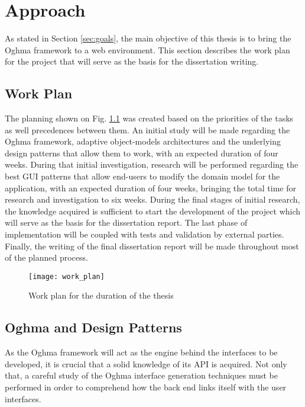 \chapter{Approach}\label{chap:approach}

As stated in Section \ref{sec:goals}, the main objective of this thesis is to bring the Oghma framework to a web environment. This section describes the work plan for the project that will serve as the basis for the dissertation writing.

\section{Work Plan}\label{sec:work_plan}

The planning shown on Fig. \ref{fig:work_plan} was created based on the priorities of the tasks as well precedences between them. An initial study will be made regarding the Oghma framework, adaptive object-models architectures and the underlying design patterns that allow them to work, with an expected duration of four weeks. During that initial investigation, research will be performed regarding the best GUI patterns that allow end-users to modify the domain model for the application, with an expected duration of four weeks, bringing the total time for research and investigation to six weeks. During the final stages of initial research, the knowledge acquired is sufficient to start the development of the project which will serve as the basis for the dissertation report. The last phase of implementation will be coupled with tests and validation by external parties. Finally, the writing of the final dissertation report will be made throughout most of the planned process.

\begin{figure}[H]
  \texttt{[image: work\_plan]}
  \caption{Work plan for the duration of the thesis}
  \label{fig:work_plan}
\end{figure}

\section{Oghma and Design Patterns}\label{sec:oghma_and_design_patterns}

As the Oghma framework will act as the engine behind the interfaces to be developed, it is crucial that a solid knowledge of its API is acquired. Not only that, a careful study of the Oghma interface generation techniques must be performed in order to comprehend how the back end links itself with the user interfaces.


